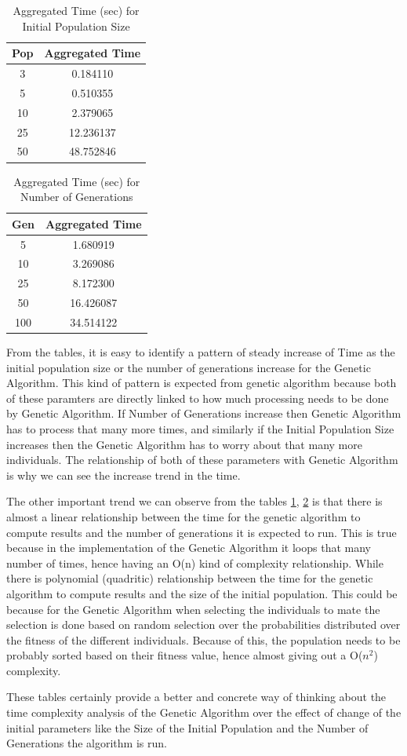\documentclass[11pt]{article}
\begin{document}
\begin{table}
\centering
\caption{Aggregated Time (sec) for Initial Population Size}
\begin{tabular}{| c || c |} %
\hline %
 Pop &  Aggregated Time \\
   \hline \hline
3   &   0.184110 \\
\hline
5   &   0.510355 \\
\hline
10  &   2.379065 \\
\hline
25  &  12.236137 \\
\hline
50  &  48.752846 \\
\hline
   \end{tabular}
\label{tab:pd_1} 
\end{table}


\begin{table}
\centering
\caption{Aggregated Time (sec) for Number of Generations}
\begin{tabular}{| c || c |} %
\hline %
 Gen &  Aggregated Time \\
   \hline \hline
5   &   1.680919 \\
\hline
10  &   3.269086 \\
\hline
25  &   8.172300 \\
\hline
50  &  16.426087 \\
\hline
100 &  34.514122 \\
\hline
   \end{tabular}
\label{tab:pd_2} 
\end{table}



From the tables, it is easy to identify a pattern of steady increase of Time as the initial population size or the 
number of generations increase for the Genetic Algorithm. This kind of pattern is expected from genetic algorithm because
both of these paramters are directly linked to how much processing needs to be done by Genetic Algorithm. If 
Number of Generations increase then Genetic Algorithm has to process that many more times, and similarly if the 
Initial Population Size increases then the Genetic Algorithm has to worry about that many more individuals. The relationship
of both of these parameters with Genetic Algorithm is why we can see the increase trend in the time.

The other important trend we can observe from the tables \ref{tab:pd_1}, \ref{tab:pd_2} is that there is almost a 
linear relationship between the time for the genetic algorithm to compute results and the number of generations it is
expected to run. This is true because in the implementation of the Genetic Algorithm it loops that many number of
times, hence having an O(n) kind of complexity relationship. While there is polynomial (quadritic) relationship
between the time for the genetic algorithm to compute results and the size of the initial population. This could be because 
for the Genetic Algorithm when selecting the individuals to mate the selection is done based on random selection over the probabilities distributed over the fitness of the different individuals. Because of this, the population needs to be probably sorted based on their fitness value, hence almost giving out a O($n^2$) complexity.

These tables certainly provide a better and concrete way of thinking about the time complexity analysis of the Genetic Algorithm over the effect of change of the initial parameters like the Size of the Initial Population and the Number of Generations the algorithm is run.
\end{document}
